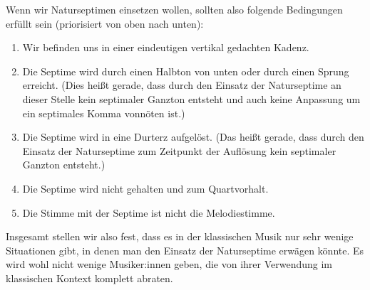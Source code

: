 Wenn wir Naturseptimen einsetzen wollen, sollten also folgende Bedingungen
erfüllt sein (priorisiert von oben nach unten):

\begin{enumerate}
\item Wir befinden uns in einer eindeutigen vertikal gedachten Kadenz.
\item Die Septime wird durch einen Halbton von unten oder durch einen Sprung
  erreicht. (Dies heißt gerade, dass durch den Einsatz der Naturseptime an
  dieser Stelle kein septimaler Ganzton entsteht und auch keine Anpassung um ein
  septimales Komma vonnöten ist.)
\item Die Septime wird in eine Durterz aufgelöst. (Das heißt gerade, dass durch
  den Einsatz der Naturseptime zum Zeitpunkt der Auflösung kein septimaler
  Ganzton entsteht.)
\item Die Septime wird nicht gehalten und zum Quartvorhalt.
\item Die Stimme mit der Septime ist nicht die Melodiestimme.
\end{enumerate}

Insgesamt stellen wir also fest, dass es in der klassischen Musik nur sehr
wenige Situationen gibt, in denen man den Einsatz der Naturseptime erwägen
könnte.  Es wird wohl nicht wenige Musiker:innen geben, die von ihrer Verwendung
im klassischen Kontext komplett abraten. 

